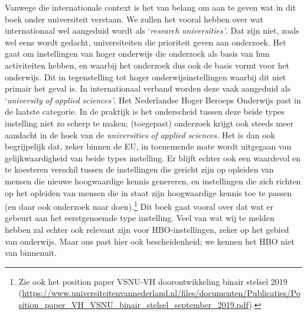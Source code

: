 \documentclass[smallauthor, chapterhaspagenum, nochapterinheader, pagenuminheader,  bigchapnum,medium2, tocpages, garamond, titleinheader]{jote-book}
\begin{document}
	Vanwege die internationale context is het van belang om aan te geven wat in dit boek onder universiteit verstaan. We zullen het vooral hebben over wat internationaal wel aangeduid wordt als ‘\emph{research }\emph{universities}\emph{'}. Dat zijn niet, zoals wel eens wordt gedacht, universiteiten die prioriteit geven aan onderzoek. Het gaat om instellingen van hoger onderwijs die onderzoek als basis van hun activiteiten hebben, en waarbij het onderzoek dus ook de basis vormt voor het onderwijs. Dit in tegenstelling tot hoger onderwijsinstellingen waarbij dit niet primair het geval is. In internationaal verband worden deze vaak aangeduid als ‘\emph{university}\emph{ of }\emph{applied}\emph{ }\emph{sciences}\emph{'}. Het Nederlandse Hoger Beroeps Onderwijs past in de laatste categorie. In de praktijk is het onderscheid tussen deze beide types instelling niet zo scherp te maken; (toegepast) onderzoek krijgt ook steeds meer aandacht in de hoek van de \emph{universities}\emph{ of }\emph{applied}\emph{ }\emph{sciences}\emph{.} Het is dan ook begrijpelijk dat, zeker binnen de EU, in toenemende mate wordt uitgegaan van gelijkwaardigheid van beide types instelling. Er blijft echter ook een waardevol en te koesteren verschil tussen de instellingen die gericht zijn op opleiden van mensen die nieuwe hoogwaardige kennis genereren, en instellingen die zich richten op het opleiden van mensen die in staat zijn hoogwaardige kennis toe te passen (en daar ook onderzoek naar doen).\footnote{Zie ook het position paper VSNU-VH doorontwikkeling binair stelsel 2019 (\href{https://www.universiteitenvannederland.nl/files/documenten/Publicaties/Position_paper_VH_VSNU_binair_stelsel_september_2019.pdf}{https://www.universiteitenvannederland.nl/files/documenten/Publicaties/Position\_paper\_VH\_VSNU\_binair\_stelsel\_september\_2019.pdf}).} Dit boek gaat vooral over dat wat er gebeurt aan het eerstgenoemde type instelling. Veel van wat wij te melden hebben zal echter ook relevant zijn voor HBO-instellingen, zeker op het gebied van onderwijs. Maar ons past hier ook bescheidenheid; we kennen het HBO niet van binnenuit.
\end{document}
